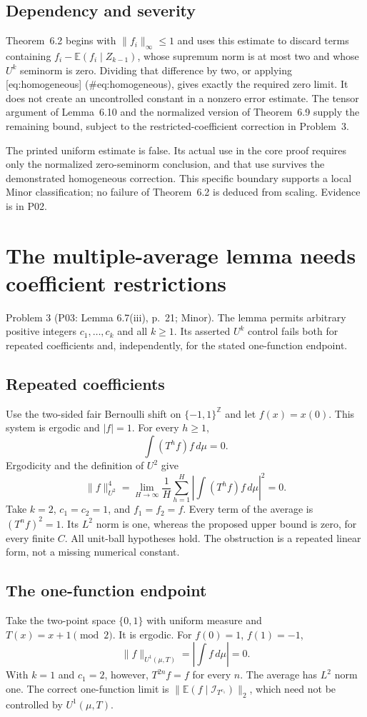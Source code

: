 \documentclass[10pt]{article}
\begin{document}
\subsection*{Dependency and severity}
Theorem 6.2 begins with \(\|f_i\|_\infty\leq1\) and uses this estimate to discard terms containing \(f_i-\mathbb E(f_i\mid Z_{k-1})\), whose supremum norm is at most two and whose \(U^k\) seminorm is zero. Dividing that difference by two, or applying [eq:homogeneous] (\#eq:homogeneous), gives exactly the required zero limit. It does not create an uncontrolled constant in a nonzero error estimate. The tensor argument of Lemma 6.10 and the normalized version of Theorem 6.9 supply the remaining bound, subject to the restricted-coefficient correction in Problem 3.\par
The printed uniform estimate is false. Its actual use in the core proof requires only the normalized zero-seminorm conclusion, and that use survives the demonstrated homogeneous correction. This specific boundary supports a local Minor classification; no failure of Theorem 6.2 is deduced from scaling. Evidence is in P02.\par
\section*{The multiple-average lemma needs coefficient restrictions}
Problem 3 (P03: Lemma 6.7(iii), p. 21; Minor).  The lemma permits arbitrary positive integers \(c_1,\ldots,c_k\) and all \(k\geq1\). Its asserted \(U^k\) control fails both for repeated coefficients and, independently, for the stated one-function endpoint.\par
\subsection*{Repeated coefficients}
Use the two-sided fair Bernoulli shift on \(\{-1,1\}^{\mathbb Z}\) and let \(f(x)=x(0)\). This system is ergodic and \(|f|=1\). For every \(h\geq1\), \[\int (T^h f)f\,d\mu=0.\] Ergodicity and the definition of \(U^2\) give \[\|f\|_{U^2}^4
 =\lim_{H\to\infty}\frac1H\sum_{h=1}^H
       \left|\int(T^hf)f\,d\mu\right|^2=0.\] Take \(k=2\), \(c_1=c_2=1\), and \(f_1=f_2=f\). Every term of the average is \((T^nf)^2=1\). Its \(L^2\) norm is one, whereas the proposed upper bound is zero, for every finite \(C\). All unit-ball hypotheses hold. The obstruction is a repeated linear form, not a missing numerical constant.\par
\subsection*{The one-function endpoint}
Take the two-point space \(\{0,1\}\) with uniform measure and \(T(x)=x+1\pmod2\). It is ergodic. For \(f(0)=1\), \(f(1)=-1\), \[\|f\|_{U^1(\mu,T)}=\left|\int f\,d\mu\right|=0.\] With \(k=1\) and \(c_1=2\), however, \(T^{2n}f=f\) for every \(n\). The average has \(L^2\) norm one. The correct one-function limit is \(\|\mathbb E(f\mid\mathcal I_{T^{c_1}})\|_2\), which need not be controlled by \(U^1(\mu,T)\).\par
\end{document}
